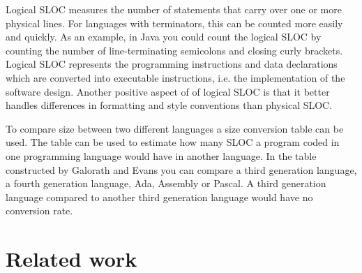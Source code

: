 Logical SLOC measures the number of statements that carry over one or more physical lines.  For languages with terminators, this can be counted more easily and quickly. As an example, in Java you could count the logical SLOC by counting the number of line-terminating semicolons and closing curly brackets. Logical SLOC represents the programming instructions and data declarations which are converted into executable instructions, i.e. the implementation of the software design. Another positive aspect of of logical SLOC is that it better handles differences in formatting and style conventions than physical SLOC\cite[p.~155]{galorath2006}.

To compare size between two different languages a size conversion table can be used. The table can be used to estimate how many SLOC a program coded in one programming language would have in another language. In the table constructed by Galorath and Evans you can compare a third generation language, a fourth generation language, Ada, Assembly or Pascal\cite[p.~163]{galorath2006}. A third generation language compared to another third generation language would have no conversion rate. 

\section{Related work}\label{section-related-work}

\iffalse
\subsection{Development goals} \label{subsection-development-goals}
Antoher goal is that the mobile application only provides data from native functions. In order to achieve that the web application and mobile application should have a master slave relationship. Where the web application acts as the master and the mobile application as the slave. To get data from the mobiles native functions the web application asks for the data and the mobile application passes the data back.

To enable this master and slave relationship the mobile and web application layer must be able to communicate. Passing commands and data between the layers. It is important the mobile and web application layers has a way of communicating that is developer friendly. 

It is important that the logic of the web application can be written in a general way (non-platform dependant) adapting to the device accessing the web application. So that the same web application code is used for the web application and mobile application.
\fi